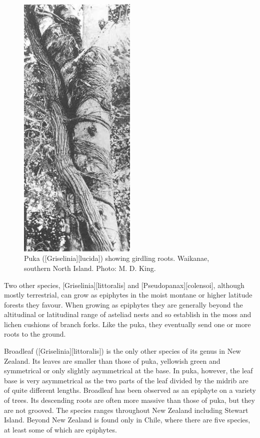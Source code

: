 \begin{figure}
	\includegraphics[width=0.5\textwidth]{graphics/figure48puka-roots.jpg}
	\centering
	\caption[]{Puka ([Griselinia][lucida]) showing girdling roots.
	Waikanae, southern North Island.
	Photo: M. D. King.}%
	\label{fig:48puka-roots}
\end{figure}

Two other species, [Griselinia][littoralis] and [Pseudopanax][colensoi], although mostly terrestrial, can grow as epiphytes in the moist montane or higher latitude forests they favour.
When growing as epiphytes they are generally beyond the altitudinal or latitudinal range of asteliad nests and so establish in the moss and lichen cushions of branch forks.
Like the puka, they eventually send one or more roots to the ground.

Broadleaf ([Griselinia][littoralis]) is the only other species of its genus in New Zealand.
Its leaves are smaller than those of puka, yellowish green and symmetrical or only slightly asymmetrical at the base.
In puka, however, the leaf base is very asymmetrical as the two parts of the leaf divided by the midrib are of quite different lengths.
Broadleaf has been observed as an epiphyte on a variety of trees.
Its descending roots are often more massive than those of puka, but they are not grooved.
The species ranges throughout New Zealand including Stewart Island.
Beyond New Zealand  is found only in Chile, where there are five species, at least some of which are epiphytes.

